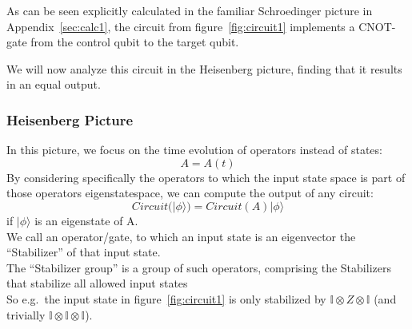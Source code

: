 As can be seen explicitly calculated in the familiar Schroedinger 
picture in Appendix~\ref{sec:calc1}, the circuit from figure~\ref{fig:circuit1}
implements a CNOT-gate from the control qubit to the target qubit.

We will now analyze this circuit in the Heisenberg picture,
finding that it results in an equal output.

\subsubsection{Heisenberg Picture}
In this picture, we focus on the time evolution of operators instead
of states:
\begin{equation}
	A = A(t)
\end{equation}
By considering specifically the operators to which the input state
space is part of those operators eigenstatespace, we can compute
the output of any circuit:
\begin{equation}
	Circuit(|\phi\rangle) = Circuit(A)|\phi\rangle
\end{equation}
if $|\phi\rangle$ is an eigenstate of A.\\
We call an operator/gate, to which an input state is an eigenvector the 
``Stabilizer'' of that input state. \\
The ``Stabilizer group'' is a group of such operators, comprising the
Stabilizers that stabilize all allowed input states \\
So e.g.\ the input state in figure~\ref{fig:circuit1} is only 
stabilized by $\mathbb{I} \otimes Z \otimes \mathbb{I}$ 
(and trivially $\mathbb{I} \otimes \mathbb{I} \otimes \mathbb{I}$).















